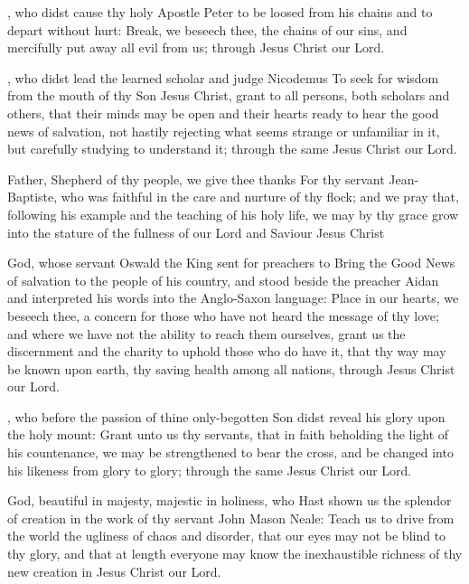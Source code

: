 , who didst cause thy holy Apostle Peter to be loosed from his chains and to depart without hurt: Break, we beseech thee, the chains of our sins, and mercifully put away all evil from us; through Jesus Christ our Lord.

, who didst lead the learned scholar and judge Nicodemus To seek for wisdom from the mouth of thy Son Jesus Christ, grant to all persons, both scholars and others, that their minds may be open and their hearts ready to hear the good news of salvation, not hastily rejecting what seems strange or unfamiliar in it, but carefully studying to understand it; through the same Jesus Christ our Lord.

 Father, Shepherd of thy people, we give thee thanks For thy servant Jean-Baptiste, who was faithful in the care and nurture of thy flock; and we pray that, following his example and the teaching of his holy life, we may by thy grace grow into the stature of the fullness of our Lord and Saviour Jesus Christ

 God, whose servant Oswald the King sent for preachers to Bring the Good News of salvation to the people of his country, and stood beside the preacher Aidan and interpreted his words into the Anglo-Saxon language: Place in our hearts, we beseech thee, a concern for those who have not heard the message of thy love; and where we have not the ability to reach them ourselves, grant us the discernment and the charity to uphold those who do have it, that thy way may be known upon earth, thy saving health among all nations, through Jesus Christ our Lord.

, who before the passion of thine only-begotten Son didst reveal his glory upon the holy mount: Grant unto us thy servants, that in faith beholding the light of his countenance, we may be strengthened to bear the cross, and be changed into his likeness from glory to glory; through the same Jesus Christ our Lord.

 God, beautiful in majesty, majestic in holiness, who Hast shown us the splendor of creation in the work of thy servant John Mason Neale: Teach us to drive from the world the ugliness of chaos and disorder, that our eyes may not be blind to thy glory, and that at length everyone may know the inexhaustible richness of thy new creation in Jesus Christ our Lord.

